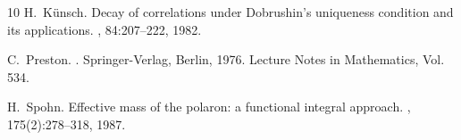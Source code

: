 \documentclass[a4paper,12pt,reqno]{amsart}
\begin{document}
\begin{thebibliography}{10}
H.~K{\"u}nsch.
\newblock Decay of correlations under {D}obrushin's uniqueness condition and
  its applications.
, 84:207--222, 1982.

C.~Preston.
.
\newblock Springer-Verlag, Berlin, 1976.
\newblock Lecture Notes in Mathematics, Vol. 534.

H.~Spohn.
\newblock Effective mass of the polaron: a functional integral approach.
, 175(2):278--318, 1987.

\end{thebibliography}
\end{document}
